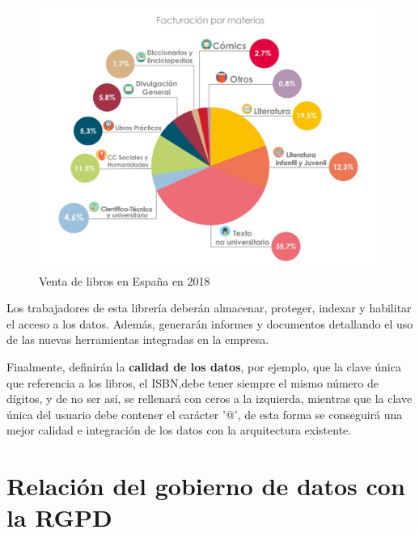 \documentclass{article}
\begin{document}
\begin{figure}
	\centering
	\includegraphics[width=0.8\linewidth]{facturacion-por-materias}
	\caption{Venta de libros en España en 2018}
	\label{fig:facturacion-por-materias-1024x785}
\end{figure}



Los trabajadores de esta librería deberán almacenar, proteger, indexar y habilitar el acceso a los datos. Además, generarán informes y documentos detallando el uso de las nuevas herramientas integradas en la empresa.

Finalmente, definirán la \textbf{calidad de los datos}, por ejemplo, que la clave única que referencia a los libros, el ISBN,debe tener siempre el mismo número de dígitos, y de no ser así, se rellenará con ceros a la izquierda, mientras que la clave única del usuario debe contener el carácter '@', de esta forma se conseguirá una mejor calidad e integración de los datos con la arquitectura existente.
 


\section{Relación del gobierno de datos con la RGPD}
\end{document}
